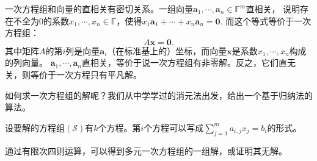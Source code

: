 \documentclass[12pt,UTF8,fontset=none]{ctexbook}
\begin{document}
一次方程组和向量的直相关有密切关系。一组向量$\mathbf{a}_1, \cdots , \mathbf{a}_n \in \mathbb{F}^m$直相关，
说明存在不全为$0$的系数$x_1, \cdots , x_n \in \mathbb{F}$，使得$x_1\mathbf{a}_1 + \cdots + x_n\mathbf{a}_n = \mathbf{0}.$
而这个等式等价于一次方程组：
$$ A\mathbf{x} = \mathbf{0}.$$
其中矩阵$A$的第$i$列是向量$\mathbf{a}_i$（在标准基上的）坐标，而向量$\mathbf{x}$是系数$x_1, \cdots , x_n$构成的列向量。
$\mathbf{a}_1, \cdots , \mathbf{a}_n$直相关，等价于说一次方程组有非零解。反之，它们直无关，则等价于一次方程只有平凡解。

如何求一次方程组的解呢？我们从中学学过的消元法出发，给出一个基于归纳法的算法。

设要解的方程组$(\mathcal{S})$有$k$个方程。第$i$个方程可以写成$\sum_{j=1}^m a_{i,j} x_j = b_{i}$的形式。


\begin{pp}\label{pp:5_0_0}
通过有限次四则运算，可以得到多元一次方程组的一组解，或证明其无解。
\end{pp}
\end{document}
